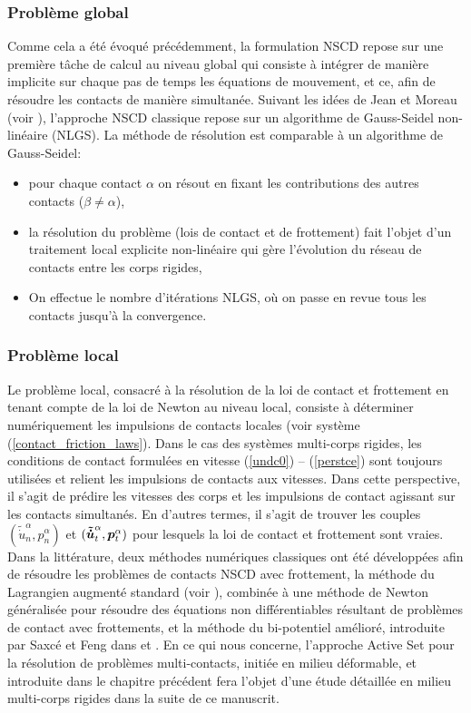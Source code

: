 \subsubsection{Problème global}

Comme cela a été évoqué précédemment, la formulation NSCD repose sur une première tâche de calcul au niveau global qui consiste à intégrer de manière implicite sur chaque pas de temps les équations de mouvement, et ce, afin de résoudre les contacts de manière simultanée. Suivant les idées de Jean et Moreau (voir \cite{jean1999non, jourdan1998gauss, moreau1988unilateral}), l'approche NSCD classique repose sur un algorithme de Gauss-Seidel non-linéaire (NLGS). La méthode de résolution est comparable à un algorithme de Gauss-Seidel:

\begin{itemize}
    \item pour chaque contact $\alpha$ on résout en fixant les contributions des autres contacts ($\beta \neq \alpha$),
    \item la résolution du problème (lois de contact et de frottement) fait l'objet d'un traitement local explicite non-linéaire qui gère l'évolution du réseau de contacts entre les corps rigides,
    \item On effectue le nombre d’itérations NLGS, où on passe en revue tous les contacts jusqu'à la convergence.
\end{itemize}

\subsubsection{Problème local}

Le problème local, consacré à la résolution de la loi de contact et frottement en tenant compte de la loi de Newton au niveau local, consiste à déterminer numériquement les impulsions de contacts locales (voir système (\ref{contact_friction_laws}). Dans le cas des systèmes multi-corps rigides, les conditions de contact formulées en vitesse (\ref{undc0}) -- (\ref{perstce}) sont toujours utilisées et relient les impulsions de contacts aux vitesses. Dans cette perspective, il s'agit de prédire les vitesses des corps et les impulsions de contact agissant sur les contacts simultanés. En d'autres termes, il s'agit de trouver les couples $(\tilde{\dot{u}}_{n}^{\alpha},p_{n}^{\alpha})$ et 
$(\boldsymbol{\tilde{\dot{u}}}_{t}^{\alpha},\boldsymbol{p}_{t}^{\alpha})$ pour lesquels la loi de contact et frottement sont vraies.\\
Dans la littérature, deux méthodes numériques classiques ont été développées afin de résoudre les problèmes de contacts NSCD avec frottement, la méthode du Lagrangien augmenté standard (voir \cite{alart1991mixed}), combinée à une méthode de Newton généralisée pour résoudre des équations non différentiables résultant de problèmes de contact avec frottements, et la méthode du bi-potentiel amélioré, introduite par Saxcé et Feng dans \cite{de1991new} et \cite{fortin2002improved}. En ce qui nous concerne, l'approche Active Set  pour la résolution de problèmes multi-contacts, initiée en milieu déformable, et introduite dans le chapitre précédent fera l'objet d'une étude détaillée en milieu multi-corps rigides dans la suite de ce manuscrit.

